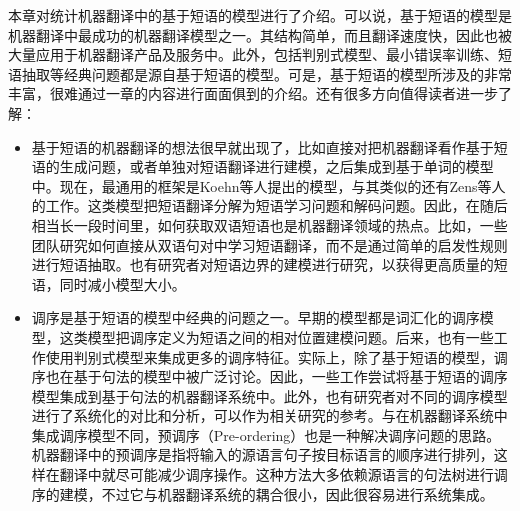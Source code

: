 \parinterval 本章对统计机器翻译中的基于短语的模型进行了介绍。可以说，基于短语的模型是机器翻译中最成功的机器翻译模型之一。其结构简单，而且翻译速度快，因此也被大量应用于机器翻译产品及服务中。此外，包括判别式模型、最小错误率训练、短语抽取等经典问题都是源自基于短语的模型。可是，基于短语的模型所涉及的非常丰富，很难通过一章的内容进行面面俱到的介绍。还有很多方向值得读者进一步了解：

\begin{itemize}
\vspace{0.5em}
\item 基于短语的机器翻译的想法很早就出现了，比如直接对把机器翻译看作基于短语的生成问题，或者单独对短语翻译进行建模，之后集成到基于单词的模型中。现在，最通用的框架是Koehn等人提出的模型，与其类似的还有Zens等人的工作。这类模型把短语翻译分解为短语学习问题和解码问题。因此，在随后相当长一段时间里，如何获取双语短语也是机器翻译领域的热点。比如，一些团队研究如何直接从双语句对中学习短语翻译，而不是通过简单的启发性规则进行短语抽取。也有研究者对短语边界的建模进行研究，以获得更高质量的短语，同时减小模型大小。
\vspace{0.5em}
\item 调序是基于短语的模型中经典的问题之一。早期的模型都是词汇化的调序模型，这类模型把调序定义为短语之间的相对位置建模问题。后来，也有一些工作使用判别式模型来集成更多的调序特征。实际上，除了基于短语的模型，调序也在基于句法的模型中被广泛讨论。因此，一些工作尝试将基于短语的调序模型集成到基于句法的机器翻译系统中。此外，也有研究者对不同的调序模型进行了系统化的对比和分析，可以作为相关研究的参考。与在机器翻译系统中集成调序模型不同，预调序（Pre-ordering）也是一种解决调序问题的思路。机器翻译中的预调序是指将输入的源语言句子按目标语言的顺序进行排列，这样在翻译中就尽可能减少调序操作。这种方法大多依赖源语言的句法树进行调序的建模，不过它与机器翻译系统的耦合很小，因此很容易进行系统集成。

\end{itemize}

